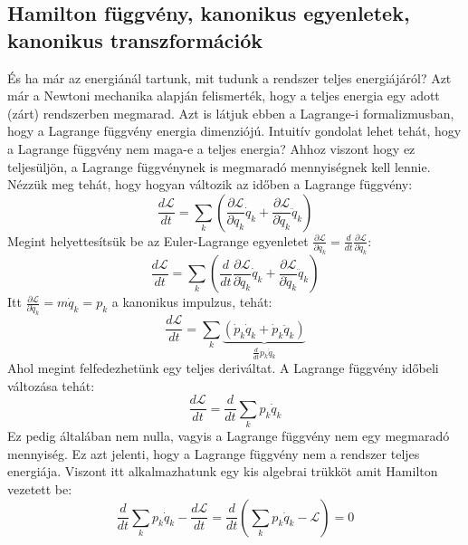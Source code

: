 \documentclass[../main.tex]{subfiles}
\begin{document}
\subsection{Hamilton függvény, kanonikus egyenletek, kanonikus transzformációk}
És ha már az energiánál tartunk, mit tudunk a rendszer teljes energiájáról? Azt már a Newtoni mechanika alapján felismerték, hogy a teljes energia egy adott (zárt) rendszerben megmarad. Azt is látjuk ebben a Lagrange-i formalizmusban, hogy a Lagrange függvény energia dimenziójú. Intuitív gondolat lehet tehát, hogy a Lagrange függvény nem maga-e a teljes energia? Ahhoz viszont hogy ez teljesüljön, a Lagrange függvénynek is megmaradó mennyiségnek kell lennie. Nézzük meg tehát, hogy hogyan változik az időben a Lagrange függvény:
\begin{equation}
    \frac{d \mathcal{L}}{dt} = \sum_k \left(\frac{\partial \mathcal{L}}{\partial q_k} \dot{q}_k + \frac{\partial \mathcal{L}}{\partial \dot{q}_k} \ddot{q}_k \right)
\end{equation}
Megint helyettesítsük be az Euler-Lagrange egyenletet $\frac{\partial \mathcal{L}}{\partial q_k} = \frac{d}{dt} \frac{\partial \mathcal{L}}{\partial \dot{q}_k}$:
\begin{equation}
    \frac{d \mathcal{L}}{dt} = \sum_k \left(\frac{d}{dt} \frac{\partial \mathcal{L}}{\partial \dot{q}_k} \dot{q}_k + \frac{\partial \mathcal{L}}{\partial \dot{q}_k} \ddot{q}_k \right)
\end{equation}
Itt $\frac{\partial \mathcal{L}}{\partial \dot{q}_k} = m \dot{q}_k = p_k$ a kanonikus impulzus, tehát:
\begin{equation}
    \frac{d \mathcal{L}}{dt} = \sum_k \underbrace{\left( \dot{p}_k \dot{q}_k + \dot{p}_k \ddot{q}_k \right)}_{\frac{d}{dt} p_k \dot{q}_k}
\end{equation}
Ahol megint felfedezhetünk egy teljes deriváltat. A Lagrange függvény időbeli változása tehát:
\begin{equation}
    \frac{d \mathcal{L}}{dt} = \frac{d}{dt} \sum_k p_k \dot{q}_k
\end{equation}
Ez pedig általában nem nulla, vagyis a Lagrange függvény nem egy megmaradó mennyiség. Ez azt jelenti, hogy a Lagrange függvény nem a rendszer teljes energiája. Viszont itt alkalmazhatunk egy kis algebrai trükköt amit Hamilton vezetett be:
\begin{equation}
     \frac{d}{dt} \sum_k p_k \dot{q}_k - \frac{d \mathcal{L}}{dt} = \frac{d}{dt} \left( \sum_k p_k \dot{q}_k - \mathcal{L}\right) = 0
\end{equation}
\end{document}
